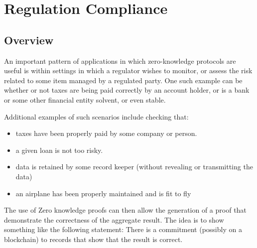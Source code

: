 \section{Regulation Compliance}
\label{apps:regulation-compliance}


\subsection{Overview}
\label{apps:regulation-compliance:overview}

An important pattern of applications in which zero-knowledge protocols are useful is within settings in which a regulator wishes to monitor, or assess the risk related to some item managed by a regulated party. One such example can be whether or not taxes are being paid correctly by an account holder, or is a bank or some other financial entity solvent, or even stable. 


Additional examples of such scenarios include checking that: 
\begin{itemize}
    \item taxes have been properly paid by some company or person.
    \item a given loan is not too risky.
    \item data is retained by some record keeper (without revealing or transmitting the data)
    \item an airplane has been properly maintained and is fit to fly 
\end{itemize}

The use of Zero knowledge proofs can then allow the generation of a proof that demonstrate the correctness of the aggregate result. The idea is to show something like the following statement: There is a commitment (possibly on a blockchain) to records that show that the result is correct. 


